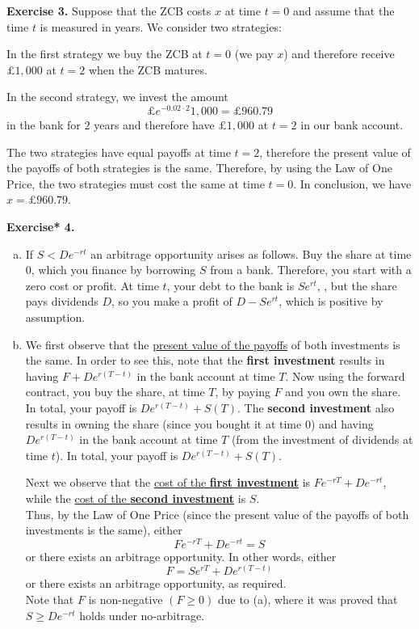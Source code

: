 \documentclass[11pt,a4paper]{report}
\begin{document}
    \textbf{Exercise 3.} Suppose that the ZCB costs $x$ at time $t = 0$ and assume that the time $t$ is measured in years. We consider two strategies:\par 
    In the first strategy we buy the ZCB at $t = 0$ (we pay $x$) and therefore receive $\pounds 1, 000$ at $t = 2$ when the ZCB matures.\par 
    In the second strategy, we invest the amount
    $$
    \pounds e^{-0.02 \cdot 2 } 1,000
    = \pounds 960.79
    $$
    in the bank for $2$ years and therefore have $\pounds 1, 000$ at $t = 2$ in our bank account.\par 
    The two strategies have equal payoffs at time $t = 2$, therefore the present value of the payoffs of both strategies is the same. Therefore, by using the Law of One Price, the two strategies must cost the same at time $t = 0$. In conclusion, we have $x = \pounds 960.79$.\par 
    \textbf{Exercise* 4.}
    \begin{enumerate}[(a)]
        \item If $S < De^{-rt}$ an arbitrage opportunity arises as follows. Buy the share at time $0$, which you finance by borrowing $S$ from a bank. Therefore, you start with a zero cost or profit. At time $t$, your debt to the bank is $Se^{rt}$, , but the share pays dividends $D$, so you make a profit of $D-Se^{rt}$, which is positive by assumption.
        \item We first observe that the \underline{present value of the payoffs} of both investments is the same. In order to see this, note that the \textbf{first investment} results in having $F+De^{r(T-t)}$ in the bank account at time $T$. Now using the forward contract, you buy the share, at time $T$, by paying $F$ and you own the share. In total, your payoff is $De^{r(T-t)}+S(T)$. The \textbf{second investment} also results in owning the share (since you bought it at time 0) and having $De^{r(T-t)}$ in the bank account at time $T$ (from the investment of dividends at time $t$). In total, your payoff is $De^{r(T-t)}+S(T)$.\par 
        Next we observe that the \underline{cost of the \textbf{first investment}} is $Fe^{-rT}+De^{-rt}$,\\
        while the \underline{cost of the \textbf{second investment}} is $S$.\\
        Thus, by the Law of One Price (since the present value of the payoffs of both investments is the same), either
        $$
        Fe^{-rT}+De^{-rt}=S
        $$
        or there exists an arbitrage opportunity. In other words, either
        $$
        F = Se^{rT}+De^{r(T-t)}
        $$
        or there exists an arbitrage opportunity, as required.\\
        Note that $F$ is non-negative $(F \geq 0)$ due to (a), where it was proved that $S \geq D e^{−rt}$ holds under no-arbitrage.
    \end{enumerate}

    
\end{document}
